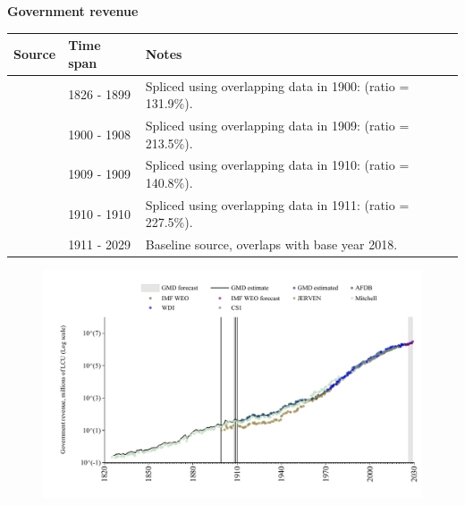 \documentclass[12pt,a4paper,landscape]{article}
\begin{document}
\begin{adjustbox}{max totalsize={\paperwidth}{\paperheight},center}
\begin{minipage}[t][\textheight][t]{\textwidth}
\vspace*{0.5cm}
{}
\begin{center}
{\Large\bfseries Government revenue}
\end{center}
\vspace{0.5cm}
\begin{table}[H]
\centering
\small
\begin{tabular}{|l|l|l|}
\hline
\textbf{Source} & \textbf{Time span} & \textbf{Notes} \\
\hline
\rowcolor{white}\cite{Mitchell}& 1826 - 1899 &Spliced using overlapping data in 1900: (ratio = 131.9\%). \\
\rowcolor{lightgray}\cite{JERVEN}& 1900 - 1908 &Spliced using overlapping data in 1909: (ratio = 213.5\%). \\
\rowcolor{white}\cite{Mitchell}& 1909 - 1909 &Spliced using overlapping data in 1910: (ratio = 140.8\%). \\
\rowcolor{lightgray}\cite{JERVEN}& 1910 - 1910 &Spliced using overlapping data in 1911: (ratio = 227.5\%). \\
\rowcolor{white}\cite{GMD_estimated}& 1911 - 2029 &Baseline source, overlaps with base year 2018. \\
\hline
\end{tabular}
\end{table}
\begin{figure}[H]
\centering
\includegraphics[width=\textwidth,height=0.6\textheight,keepaspectratio]{graphs/ZAF_govrev.pdf}
\end{figure}
\end{minipage}
\end{adjustbox}
\end{document}
